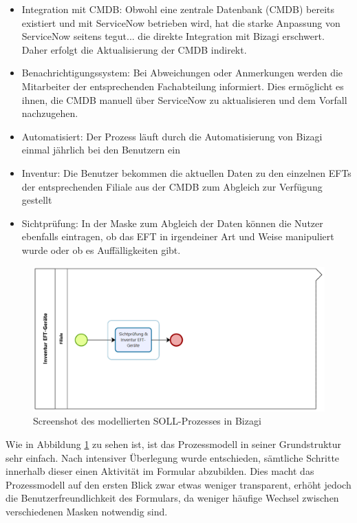 \documentclass[12pt, a4paper]{article}
\begin{document}
\begin{itemize}
\item Integration mit CMDB: Obwohl eine zentrale Datenbank (CMDB) bereits existiert und mit ServiceNow betrieben wird, hat die starke Anpassung von ServiceNow seitens tegut... 
die direkte Integration mit Bizagi erschwert. Daher erfolgt die Aktualisierung der CMDB indirekt.
\item Benachrichtigungssystem: Bei Abweichungen oder Anmerkungen werden die Mitarbeiter der entsprechenden Fachabteilung informiert. Dies ermöglicht es ihnen, die 
CMDB manuell über ServiceNow zu aktualisieren und dem Vorfall nachzugehen.
\item Automatisiert: Der Prozess läuft durch die Automatisierung von Bizagi einmal jährlich bei den Benutzern ein
\item Inventur: Die Benutzer bekommen die aktuellen Daten zu den einzelnen EFTs der entsprechenden Filiale aus der CMDB zum Abgleich zur Verfügung gestellt
\item Sichtprüfung: In der Maske zum Abgleich der Daten können die Nutzer ebenfalls eintragen, ob das EFT in irgendeiner Art und Weise manipuliert wurde oder ob es Auffälligkeiten gibt. 
\end{itemize}

\begin{figure}[h]
    \centering
    \includegraphics[width=\textwidth]{images/process.png}
    \caption{Screenshot des modellierten SOLL-Prozesses in Bizagi}
    \label{fig:soll_process}
\end{figure}

Wie in Abbildung \ref{fig:soll_process} zu sehen ist, ist das Prozessmodell in seiner Grundstruktur sehr einfach. Nach intensiver Überlegung wurde entschieden, 
sämtliche Schritte innerhalb dieser einen Aktivität im Formular abzubilden. Dies macht das Prozessmodell auf den ersten Blick zwar etwas weniger transparent, erhöht 
jedoch die Benutzerfreundlichkeit des Formulars, da weniger häufige Wechsel zwischen verschiedenen Masken notwendig sind.
\end{document}

